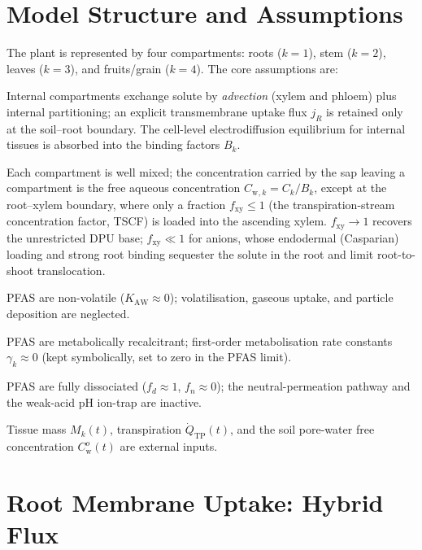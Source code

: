 \documentclass[12pt,a4paper]{article}
\newcommand{\Cw}{C_{\mathrm{w}}}
\begin{document}
\section{Model Structure and Assumptions}

The plant is represented by four compartments: roots ($k=1$), stem ($k=2$), leaves ($k=3$), and fruits/grain ($k=4$).  The core assumptions are:

\begin{description}[leftmargin=2.2em,style=nextline,nosep]
    \item[(A1)] Internal compartments exchange solute by \emph{advection} (xylem and phloem) plus internal partitioning; an explicit transmembrane uptake flux $j_R$ is retained only at the soil--root boundary.  The cell-level electrodiffusion equilibrium for internal tissues is absorbed into the binding factors $B_k$.
    \item[(A2)] Each compartment is well mixed; the concentration carried by the sap leaving a compartment is the free aqueous concentration $\Cw{}_{,k}=C_k/B_k$, except at the root--xylem boundary, where only a fraction $f_\mathrm{xy}\le1$ (the transpiration-stream concentration factor, TSCF) is loaded into the ascending xylem.  $f_\mathrm{xy}\to1$ recovers the unrestricted DPU base; $f_\mathrm{xy}\ll1$ for anions, whose endodermal (Casparian) loading and strong root binding sequester the solute in the root and limit root-to-shoot translocation.
    \item[(A3)] PFAS are non-volatile ($K_\mathrm{AW}\approx0$); volatilisation, gaseous uptake, and particle deposition are neglected.
    \item[(A4)] PFAS are metabolically recalcitrant; first-order metabolisation rate constants $\gamma_k\approx0$ (kept symbolically, set to zero in the PFAS limit).
    \item[(A5)] PFAS are fully dissociated ($f_d\approx1$, $f_n\approx0$); the neutral-permeation pathway and the weak-acid pH ion-trap are inactive.
    \item[(A6)] Tissue mass $M_k(t)$, transpiration $\dot Q_\mathrm{TP}(t)$, and the soil pore-water free concentration $C_\mathrm{w}^{o}(t)$ are external inputs.
\end{description}


\section{Root Membrane Uptake: Hybrid Flux}\label{sec:root}
\end{document}

